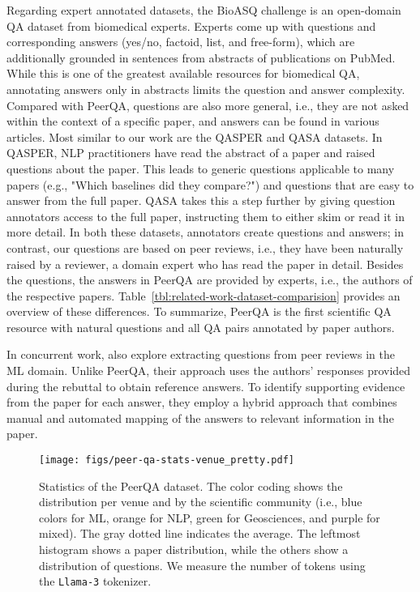 Regarding expert annotated datasets, the BioASQ challenge \citep{bioasq,krithara-et-al-2022-bioasq-qa} is an open-domain QA dataset from biomedical experts. Experts come up with questions and corresponding answers (yes/no, factoid, list, and free-form), which are additionally grounded in sentences from abstracts of publications on PubMed. While this is one of the greatest available resources for biomedical QA, annotating answers only in abstracts limits the question and answer complexity. Compared with PeerQA, questions are also more general, i.e., they are not asked within the context of a specific paper, and answers can be found in various articles.
Most similar to our work are the QASPER \citep{dasigi-etal-2021-dataset} and QASA \citep{qasa-lee-2023} datasets. In QASPER, NLP practitioners have read the abstract of a paper and raised questions about the paper. This leads to generic questions applicable to many papers (e.g., "Which baselines did they compare?") and questions that are easy to answer from the full paper. QASA takes this a step further by giving question annotators access to the full paper, instructing them to either skim or read it in more detail. In both these datasets, annotators create questions and answers; in contrast, our questions are based on peer reviews, i.e., they have been naturally raised by a reviewer, a domain expert who has read the paper in detail. Besides the questions, the answers in PeerQA are provided by experts, i.e., the authors of the respective papers. Table~\ref{tbl:related-work-dataset-comparision} provides an overview of these differences. To summarize, PeerQA is the first scientific QA resource with natural questions and all QA pairs annotated by paper authors.


In concurrent work, \citet{singh-etal-2024-scidqa} also explore extracting questions from peer reviews in the ML domain. Unlike PeerQA, their approach uses the authors' responses provided during the rebuttal to obtain reference answers. To identify supporting evidence from the paper for each answer, they employ a hybrid approach that combines manual and automated mapping of the answers to relevant information in the paper.

\begin{figure*}
    \centering
    \texttt{[image: figs/peer-qa-stats-venue\_pretty.pdf]}
    \caption{Statistics of the PeerQA dataset. The color coding shows the distribution per venue and by the scientific community (i.e., blue colors for ML, orange for NLP, green for Geosciences, and purple for mixed). The gray dotted line indicates the average. The leftmost histogram shows a paper distribution, while the others show a distribution of questions. We measure the number of tokens using the \texttt{Llama-3} tokenizer.}
    \label{fig:dataset-stats}
\end{figure*}


